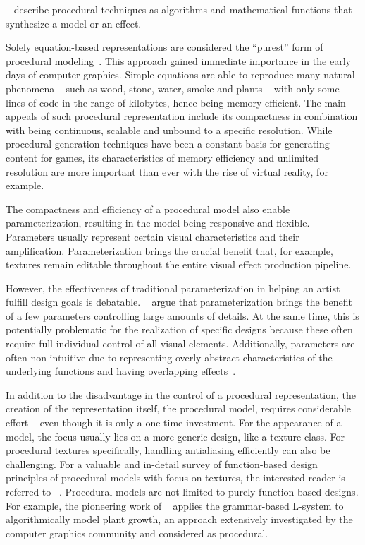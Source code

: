 \citeauthor*{ebert_2003_tmp}~\cite{ebert_2003_tmp} describe procedural techniques as algorithms and mathematical functions that synthesize a model or an effect.

Solely equation-based representations are considered the ``purest'' form of procedural modeling~\cite{smelik_2014_aso}. This approach gained immediate importance in the early days of computer graphics. Simple equations are able to reproduce many natural phenomena – such as wood, stone, water, smoke and plants – with only some lines of code in the range of kilobytes, hence being memory efficient. The main appeals of such procedural representation include its compactness in combination with being continuous, scalable and unbound to a specific resolution. While procedural generation techniques have been a constant basis for generating content for games, its characteristics of memory efficiency and unlimited resolution are more important than ever with the rise of virtual reality, for example.

The compactness and efficiency of a procedural model also enable parameterization, resulting in the model being responsive and flexible. Parameters usually represent certain visual characteristics and their amplification. Parameterization brings the crucial benefit that, for example, textures remain editable throughout the entire visual effect production pipeline.

However, the effectiveness of traditional parameterization in helping an artist fulfill design goals is debatable. \citeauthor*{ebert_2003_tmp}~\cite{ebert_2003_tmp} argue that parameterization brings the benefit of a few parameters controlling large amounts of details. At the same time, this is potentially problematic for the realization of specific designs because these often require full individual control of all visual elements. Additionally, parameters are often non-intuitive due to representing overly abstract characteristics of the underlying functions and having overlapping effects~\cite{bourque_2004_ptm,lagae_2010_pis,gilet_2010_ias,benes_2011_gpm,lasram_2012_ssf,lasram_2012_ptp}.

In addition to the disadvantage in the control of a procedural representation, the creation of the representation itself, the procedural model, requires considerable effort – even though it is only a one-time investment. For the appearance of a model, the focus usually lies on a more generic design, like a texture class. For procedural textures specifically, handling antialiasing efficiently can also be challenging. For a valuable and in-detail survey of function-based design principles of procedural models with focus on textures, the interested reader is referred to \citeauthor*{ebert_2003_tmp}~\cite{ebert_2003_tmp}. Procedural models are not limited to purely function-based designs. For example, the pioneering work of \citeauthor*{Prusinkiewicz_2012_TAB}~\cite{Prusinkiewicz_2012_TAB} applies the grammar-based L-system to algorithmically model plant growth, an approach extensively investigated by the computer graphics community and considered as procedural.

